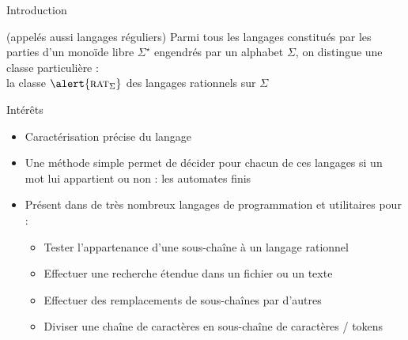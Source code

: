 
\begingroup

\begin{frame}{Introduction}

  \begin{block}{ (appelés aussi langages réguliers)}
    Parmi tous les langages constitués par les parties d'un
    monoïde libre $\Sigma^\star$ engendrés par un alphabet $\Sigma$,
    on distingue une classe particulière : \\
    la classe $\alert{\textsc{rat}_\Sigma}$ des langages rationnels sur $\Sigma$
  \end{block}
  
  \begin{block}{Intérêts} 
    \begin{itemize}
    \item Caractérisation précise du langage
    \item Une méthode simple permet de décider pour chacun de ces langages si un mot lui appartient ou non : les automates finis
    \item Présent dans de très nombreux langages de programmation et utilitaires pour :
      \begin{itemize}
      \item Tester l'appartenance d'une sous-chaîne à un langage rationnel
      \item Effectuer une recherche étendue dans un fichier ou un texte
      \item Effectuer des remplacements de sous-chaînes par d'autres 
      \item Diviser une chaîne de caractères en sous-chaîne de caractères / \alert{tokens}
      \end{itemize}
    \end{itemize}
  \end{block}

\end{frame}

\endgroup

